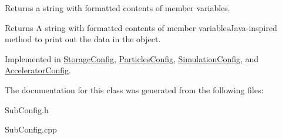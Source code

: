 Returns a string with formatted contents of member variables. 

\begin{DoxyReturn}{Returns}
A string with formatted contents of member variables\+Java-\/inspired method to print out the data in the object. 
\end{DoxyReturn}


Implemented in \hyperlink{classStorageConfig_a999c3186d9b0135535ab4d672fb9a094}{Storage\+Config}, \hyperlink{classParticlesConfig_a7a2244687fcb09024e777bd312823d53}{Particles\+Config}, \hyperlink{classSimulationConfig_a9f4f56e9187054743fc80d6cfe9d732d}{Simulation\+Config}, and \hyperlink{classAcceleratorConfig_a2d7943bead17ab085c024d52a3cc04a5}{Accelerator\+Config}.



The documentation for this class was generated from the following files\+:\begin{DoxyCompactItemize}
\item 
Sub\+Config.\+h\item 
Sub\+Config.\+cpp\end{DoxyCompactItemize}
